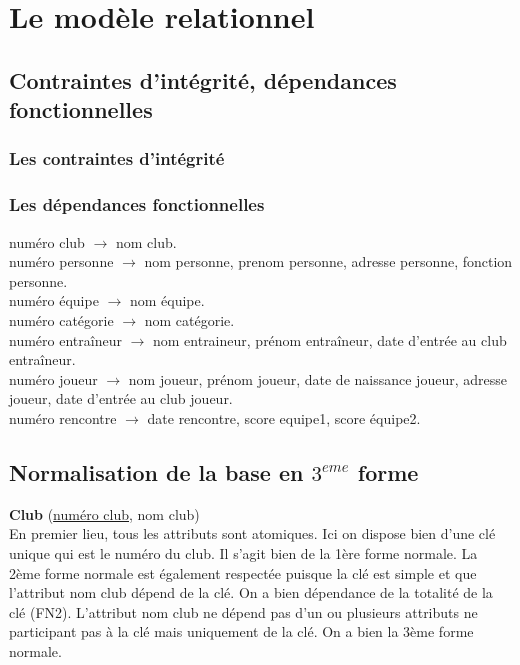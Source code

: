 \documentclass{article}
\begin{document}
\newpage
\section{Le modèle relationnel}


\subsection{Contraintes d'intégrité, dépendances fonctionnelles}

\subsubsection*{Les contraintes d'intégrité}


\newpage
\subsubsection*{Les dépendances fonctionnelles}

numéro club $\rightarrow$ nom club.  \\
numéro personne $\rightarrow$ nom personne, prenom personne, adresse personne, fonction personne. \\
numéro équipe $\rightarrow$ nom équipe.\\
numéro catégorie $\rightarrow$ nom catégorie.\\
numéro entraîneur $\rightarrow$ nom entraineur, prénom entraîneur, date d'entrée au club entraîneur. \\
numéro joueur $\rightarrow$ nom joueur, prénom joueur, date de naissance joueur, adresse joueur, date d'entrée au club joueur. \\
numéro rencontre $\rightarrow$ date rencontre, score equipe1, score équipe2. \\



\subsection{Normalisation de la base en $3^{eme}$ forme}

\textbf{Club} (\underline{numéro club}, nom club) \\
En premier lieu, tous les attributs sont atomiques. Ici on dispose bien d'une clé unique qui est le numéro du club. Il s'agit bien de la 1ère forme normale. La 2ème forme normale est également respectée puisque la clé est simple et que l'attribut nom club dépend de la clé. On a bien dépendance de la totalité de la clé (FN2). L'attribut nom club ne dépend pas d'un ou plusieurs attributs ne participant pas à la clé mais uniquement de la clé. On a bien la 3ème forme normale. \\
\end{document}
